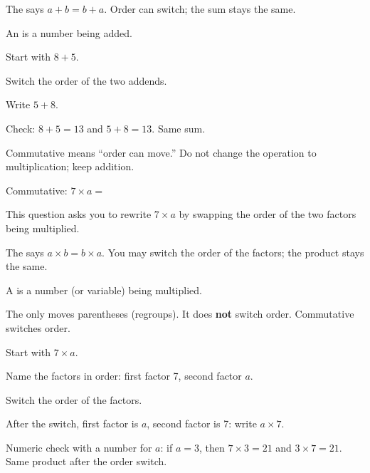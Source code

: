 \begin{words}
  \item The says $a + b = b + a$. Order can switch; the sum stays the same.
  \item An is a number being added.
\end{words}

\begin{steps}
  \item Start with $8 + 5$.
  \item Switch the order of the two addends.
  \item Write $5 + 8$.
  \item Check: $8 + 5 = 13$ and $5 + 8 = 13$. Same sum.
\end{steps}


Commutative means ``order can move.'' Do not change the operation to multiplication; keep addition.


Commutative: $7 \times a = $\ansblank


This question asks you to rewrite $7 \times a$ by swapping the order of the two factors being multiplied.

\begin{words}
  \item The says $a \times b = b \times a$. You may switch the order of the factors; the product stays the same.
  \item A is a number (or variable) being multiplied.
  \item The only moves parentheses (regroups). It does \textbf{not} switch order. Commutative switches order.
\end{words}

\begin{steps}
  \item Start with $7 \times a$.
  \item Name the factors in order: first factor 7, second factor $a$.
  \item Switch the order of the factors.
  \item After the switch, first factor is $a$, second factor is 7: write $a \times 7$.
  \item Numeric check with a number for $a$: if $a = 3$, then $7 \times 3 = 21$ and $3 \times 7 = 21$. Same product after the order switch.
\end{steps}

